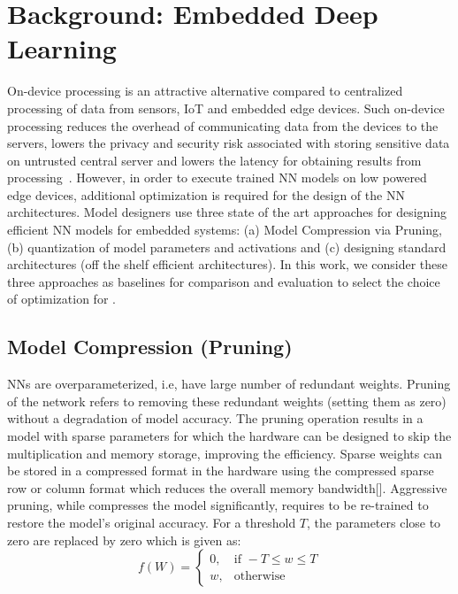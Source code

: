 \section{Background: Embedded Deep Learning}\label{background}

On-device processing is an attractive alternative compared to centralized processing of data from sensors, IoT and embedded edge devices.
Such on-device processing reduces the overhead of communicating data from the devices to the servers, lowers the privacy and security risk associated with storing sensitive data on untrusted central server and lowers the latency for obtaining results from processing~\cite{8110880}.
However, in order to execute trained NN models on low powered edge devices, additional optimization is required for the design of the NN architectures.
Model designers use three state of the art approaches for designing efficient NN models for embedded systems: (a) Model Compression via Pruning, (b) quantization of model parameters and activations and (c) designing standard architectures (off the shelf efficient architectures).
In this work, we consider these three approaches as baselines for comparison and evaluation to select the choice of optimization for \method.

\subsection{Model Compression (Pruning)} 
NNs are overparameterized, i.e, have large number of redundant weights.
Pruning of the network refers to removing these redundant weights (setting them as zero) without a degradation of model accuracy.
The pruning operation results in a model with sparse parameters for which the hardware can be designed to skip the multiplication and memory storage, improving the efficiency.
Sparse weights can be stored in a compressed format in the hardware using the compressed sparse row or column format which reduces the overall memory bandwidth[].
Aggressive pruning, while compresses the model significantly, requires to be re-trained to restore the model's original accuracy.
For a threshold $T$, the parameters close to zero are replaced by zero which is given as:
\[
    f(W)=
\begin{cases}
    0, & \text{if } -T \leq w \leq T\\
    w,  & \text{otherwise}
\end{cases}
\]

